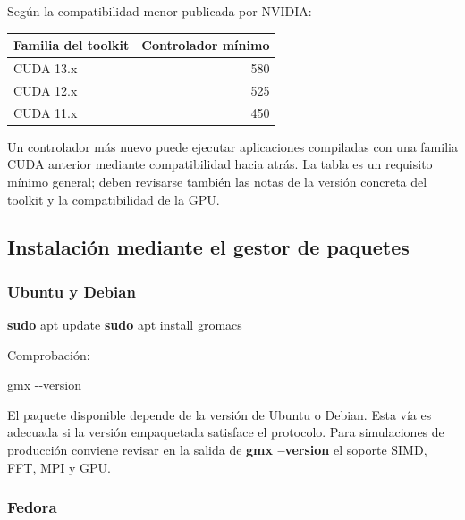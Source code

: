 \documentclass[
  spanish,
  11pt,
  a4paper]{article}
\newenvironment{Shaded}{\begin{snugshade}}{\end{snugshade}}
\newcommand{\AttributeTok}[1]{\textcolor[rgb]{0.13,0.29,0.53}{#1}}
\newcommand{\ExtensionTok}[1]{#1}
\newcommand{\FunctionTok}[1]{\textcolor[rgb]{0.13,0.29,0.53}{\textbf{#1}}}
\newcommand{\NormalTok}[1]{#1}
\newcounter{none} %
\begin{document}
Según la compatibilidad menor publicada por NVIDIA:

{\def\LTcaptype{none} %
\begin{longtable}[]{@{}lr@{}}
\toprule\noalign{}
Familia del toolkit & Controlador mínimo \\
\midrule\noalign{}
\endhead
\bottomrule\noalign{}
\endlastfoot
CUDA 13.x & 580 \\
CUDA 12.x & 525 \\
CUDA 11.x & 450 \\
\end{longtable}
}

Un controlador más nuevo puede ejecutar aplicaciones compiladas con una
familia CUDA anterior mediante compatibilidad hacia atrás. La tabla es
un requisito mínimo general; deben revisarse también las notas de la
versión concreta del toolkit y la compatibilidad de la GPU.

\subsection{Instalación mediante el gestor de
paquetes}\label{instalaciuxf3n-mediante-el-gestor-de-paquetes}

\subsubsection{Ubuntu y Debian}\label{ubuntu-y-debian}

\begin{Shaded}
\begin{Highlighting}[]
\FunctionTok{sudo}\NormalTok{ apt update}
\FunctionTok{sudo}\NormalTok{ apt install gromacs}
\end{Highlighting}
\end{Shaded}

Comprobación:

\begin{Shaded}
\begin{Highlighting}[]
\ExtensionTok{gmx} \AttributeTok{{-}{-}version}
\end{Highlighting}
\end{Shaded}

El paquete disponible depende de la versión de Ubuntu o Debian. Esta vía
es adecuada si la versión empaquetada satisface el protocolo. Para
simulaciones de producción conviene revisar en la salida de \textbf{gmx
--version} el soporte SIMD, FFT, MPI y GPU.

\subsubsection{Fedora}\label{fedora}
\end{document}
